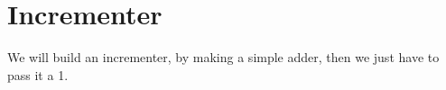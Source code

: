 

\section{Incrementer}

We will build an incrementer, by making a simple adder, then we just have to pass it a 1.